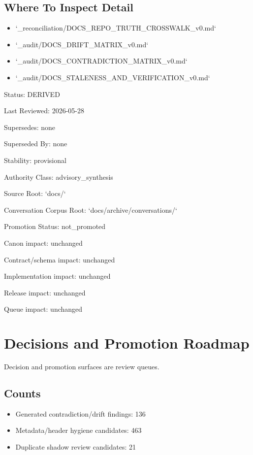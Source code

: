 \documentclass[11pt,a4paper]{report}
\begin{document}
\section{Where To Inspect Detail}

\begin{itemize}
\item `\_reconciliation/\allowbreak{}DOCS\_REPO\_TRUTH\_CROSSWALK\_v0.\allowbreak{}md`
\item `\_audit/\allowbreak{}DOCS\_DRIFT\_MATRIX\_v0.\allowbreak{}md`
\item `\_audit/\allowbreak{}DOCS\_CONTRADICTION\_MATRIX\_v0.\allowbreak{}md`
\item `\_audit/\allowbreak{}DOCS\_STALENESS\_AND\_VERIFICATION\_v0.\allowbreak{}md`
\end{itemize}


Status: DERIVED

Last Reviewed: 2026-\allowbreak{}05-\allowbreak{}28

Supersedes: none

Superseded By: none

Stability: provisional

Authority Class: advisory\_synthesis

Source Root: `docs/\allowbreak{}`

Conversation Corpus Root: `docs/\allowbreak{}archive/\allowbreak{}conversations/\allowbreak{}`

Promotion Status: not\_promoted

Canon impact: unchanged

Contract/\allowbreak{}schema impact: unchanged

Implementation impact: unchanged

Release impact: unchanged

Queue impact: unchanged


\chapter{Decisions and Promotion Roadmap}

Decision and promotion surfaces are review queues.\allowbreak{}


\section{Counts}

\begin{itemize}
\item Generated contradiction/\allowbreak{}drift findings: 136
\item Metadata/\allowbreak{}header hygiene candidates: 463
\item Duplicate shadow review candidates: 21
\end{itemize}
\end{document}

